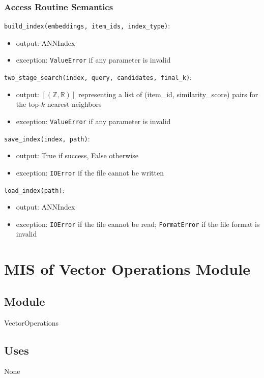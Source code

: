 \documentclass[12pt, titlepage]{article}
\begin{document}
\subsubsection{Access Routine Semantics}

\noindent \texttt{build\_index(embeddings, item\_ids, index\_type)}:
\begin{itemize}
  \item output: ANNIndex
  \item exception: \texttt{ValueError} if any parameter is invalid
\end{itemize}

\noindent \texttt{two\_stage\_search(index, query, candidates, final\_k)}:
\begin{itemize}
  \item output: $[(\mathbb{Z}, \mathbb{R})]$ representing a list of (item\_id, similarity\_score) pairs for the top-$k$ nearest neighbors
  \item exception: \texttt{ValueError} if any parameter is invalid
\end{itemize}

\noindent \texttt{save\_index(index, path)}:
\begin{itemize}
  \item output: True if success, False otherwise
  \item exception: \texttt{IOError} if the file cannot be written
\end{itemize}

\noindent \texttt{load\_index(path)}:
\begin{itemize}
  \item output: ANNIndex
  \item exception: \texttt{IOError} if the file cannot be read; \texttt{FormatError} if the file format is invalid
\end{itemize}

\newpage

\section{MIS of Vector Operations Module} \label{ModuleVO}

\subsection{Module}

VectorOperations

\subsection{Uses}
None
\end{document}
